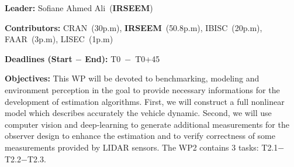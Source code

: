 \documentclass[a4paper,11pt]{article}
\begin{document}
\begin{itemize}[leftmargin=.2in,noitemsep,nolistsep]
\begin{tcolorbox}[breakable, enhanced,  colback=blue!2!white,
title = \bf Contributors$-$Deadlines$-$Objectives, coltitle= black, colbacktitle=blue!40!white, halign title=center]
{ \bf {Leader}:} Sofiane {\sc Ahmed Ali}~({\bf IRSEEM})

{ \bf {Contributors}:} {\small CRAN~(\textcolor{navyblue}{30p.m}), {\bf IRSEEM}~(\textcolor{navyblue}{50.8p.m}), IBISC~(\textcolor{navyblue}{20p.m}), FAAR~(\textcolor{navyblue}{3p.m}), LISEC~(\textcolor{navyblue}{1p.m})}

{ \bf {Deadlines (Start $-$ End)}:} T0~$-$~T0+45

{ \bf {Objectives}:} This WP will be devoted to benchmarking, modeling and environment perception in the goal to provide necessary informations for the development of estimation algorithms. First, we will construct a full nonlinear model which describes accurately the vehicle dynamic. Second, we will use computer vision and deep-learning to generate additional measurements for the observer design to enhance the estimation and to verify correctness of some measurements provided by LIDAR sensors. The WP2 contains 3 tasks: T2.1$-$T2.2$-$T2.3.


\end{tcolorbox}
\end{itemize}
\end{document}
